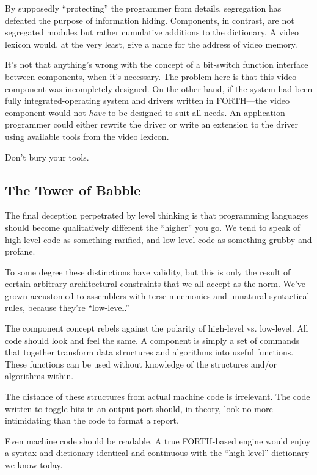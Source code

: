 By supposedly ``protecting'' the programmer from details, segregation
has defeated the purpose of information hiding. Components, in
contrast, are not segregated modules but rather cumulative additions
to the dictionary. A video lexicon would, at the very least, give a
name for the address of video memory.

It's not that anything's wrong with the concept of a bit-switch
function interface between components, when it's necessary. The
problem here is that this video component was incompletely
designed. On the other hand, if the system had been fully
integrated-operating system and drivers written in FORTH---the video
component would not \emph{have} to be designed to suit all needs. An
application programmer could either rewrite the driver or write an
extension to the driver using available tools from the video lexicon.

\begin{tip}
Don't bury your tools.
\end{tip}

\subsection{The Tower of Babble}

The final deception perpetrated by level thinking is that programming
languages should become qualitatively different the ``higher'' you go. We
tend to speak of high-level code as something rarified, and low-level code
as something grubby and profane.

To some degree these distinctions have validity, but this is only the
result of certain arbitrary architectural constraints that we all accept as
the norm. We've grown accustomed to assemblers with terse mnemonics
and unnatural syntactical rules, because they're ``low-level.''

The component concept rebels against the polarity of high-level vs.
low-level. All code should look and feel the same. A component is simply
a set of commands that together transform data structures and
algorithms into useful functions. These functions can be used without
knowledge of the structures and/or algorithms within.

The distance of these structures from actual machine code is
irrelevant. The code written to toggle bits in an output port should,
in theory, look no more intimidating than the code to format a report.

Even machine code should be readable. A true FORTH-based
engine would enjoy a syntax and dictionary identical and continuous
with the ``high-level'' dictionary we know today.

